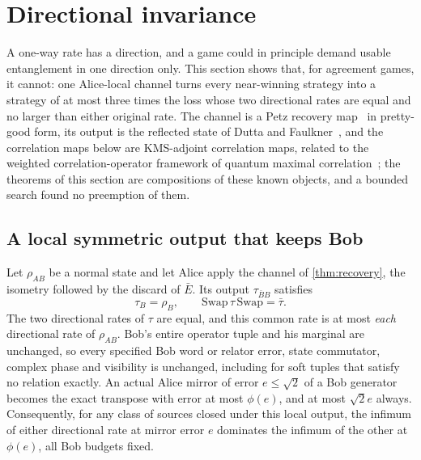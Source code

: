 \section{Directional invariance}\label{sec:direction}

A one-way rate has a direction, and a game could in principle demand usable entanglement in one direction only. This
section shows that, for agreement games, it cannot: one Alice-local channel turns every near-winning strategy into a
strategy of at most three times the loss whose two directional rates are equal and no larger than either original rate.
The channel is a Petz recovery map~\cite{Petz86} in pretty-good form, its output is the reflected state of Dutta and
Faulkner~\cite{DF19}, and the
correlation maps below are KMS-adjoint correlation maps, related to the weighted correlation-operator framework of quantum
maximal correlation~\cite{Bei13}; the theorems of this section are compositions of these known objects, and a bounded search
found no preemption of them.

\subsection{A local symmetric output that keeps Bob}\label{sec:local-symmetry}

\begin{theorem}\label{thm:local-symmetry}
Let $\rho_{AB}$ be a normal state and let Alice apply the channel of \cref{thm:recovery}, the isometry followed by the
discard of $\bar E$. Its output $\tau_{\bar BB}$ satisfies
\[
\tau_B=\rho_B,\qquad\mathrm{Swap}\,\tau\,\mathrm{Swap}=\bar\tau .
\]
The two directional rates of $\tau$ are equal, and this common rate is at most \emph{each} directional rate of $\rho_{AB}$.
Bob's entire operator tuple and his marginal are unchanged, so every specified Bob word or relator error, state
commutator, complex phase and visibility is unchanged, including for soft tuples that satisfy no relation exactly. An
actual Alice mirror of error $e\le\sqrt2$ of a Bob generator becomes the exact transpose with error at most $\phi(e)$, and
at most $\sqrt2e$ always. Consequently, for any class of sources closed under this local output, the infimum of either
directional rate at mirror error $e$ dominates the infimum of the other at $\phi(e)$, all Bob budgets fixed.
\end{theorem}

